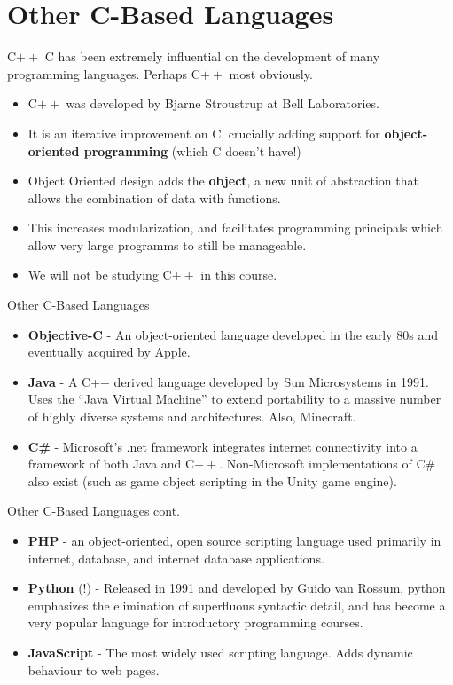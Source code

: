 \documentclass[11pt]{beamer}
\begin{document}
\section[C-Based Languages]{Other C-Based Languages}
\begin{frame}{C$++$}
C has been extremely influential on the development of many programming languages.  Perhaps C$++$ most obviously.
\begin{itemize} 
\item C$++$ was developed by Bjarne Stroustrup at Bell Laboratories.
\item It is an iterative improvement on C, crucially adding support for \textbf{object-oriented programming} (which C doesn't have!)
\item Object Oriented design adds the \textbf{object}, a new unit of abstraction that allows the combination of data with functions.
\item This increases modularization, and facilitates programming principals which allow very large programms to still be manageable.
\item We will not be studying C$++$ in this course.
\end{itemize}
\end{frame}

\begin{frame}{Other C-Based Languages} 
\begin{itemize}
\item \textbf{Objective-C} - An object-oriented language developed in the early 80s and eventually acquired by Apple.
\item \textbf{Java} - A C++ derived language developed by Sun Microsystems in 1991.  Uses the ``Java Virtual Machine'' to extend portability to a massive number of highly diverse systems and architectures.  Also, Minecraft.  
\item \textbf{C\#} - Microsoft's .net framework integrates internet connectivity into a framework of both Java and C$++$.  Non-Microsoft implementations of C\# also exist (such as game object scripting in the Unity game engine).
\end{itemize}
\end{frame}

\begin{frame}{Other C-Based Languages cont.}
\begin{itemize}
\item \textbf{PHP} - an object-oriented, open source scripting language used primarily in internet, database, and internet database applications.
\item \textbf{Python} (!) - Released in 1991 and developed by Guido van Rossum, python emphasizes the elimination of superfluous syntactic detail, and has become a very popular language for introductory programming courses.
\item \textbf{JavaScript} - The most widely used scripting language.  Adds dynamic behaviour to web pages.  
\end{itemize}
\end{frame}
\end{document}
